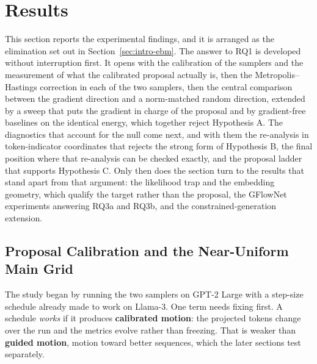 \section{Results}
\label{ch:results}

This section reports the experimental findings, and it is arranged as the elimination set out in Section~\ref{sec:intro-ebm}. The answer to RQ1 is developed without interruption first. It opens with the calibration of the samplers and the measurement of what the calibrated proposal actually is, then the Metropolis--Hastings correction in each of the two samplers, then the central comparison between the gradient direction and a norm-matched random direction, extended by a sweep that puts the gradient in charge of the proposal and by gradient-free baselines on the identical energy, which together reject Hypothesis A. The diagnostics that account for the null come next, and with them the re-analysis in token-indicator coordinates that rejects the strong form of Hypothesis B, the final position where that re-analysis can be checked exactly, and the proposal ladder that supports Hypothesis C. Only then does the section turn to the results that stand apart from that argument: the likelihood trap and the embedding geometry, which qualify the target rather than the proposal, the GFlowNet experiments answering RQ3a and RQ3b, and the constrained-generation extension.

\subsection{Proposal Calibration and the Near-Uniform Main Grid}
\label{sec:results-stepsize}

The study began by running the two samplers on GPT-2 Large with a step-size schedule already made to work on Llama-3. One term needs fixing first. A schedule \emph{works} if it produces \textbf{calibrated motion}: the projected tokens change over the run and the metrics evolve rather than freezing. That is weaker than \textbf{guided motion}, motion toward better sequences, which the later sections test separately.

